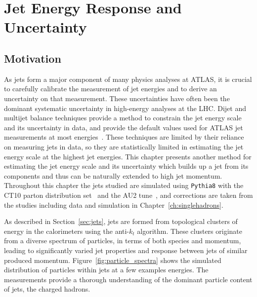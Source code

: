 \chapter{Jet Energy Response and Uncertainty}

\label{ch:jes}

\section{Motivation}

As jets form a major component of many physics analyses at ATLAS, it is crucial to carefully calibrate the measurement of jet energies and to derive an uncertainty on that measurement.
These uncertainties have often been the dominant systematic uncertainty in high-energy analyses at the LHC.
Dijet and multijet balance techniques provide a method to constrain the jet energy scale and its uncertainty in data, and provide the default values used for ATLAS jet measurements at most energies~\cite{PERF-2012-01}.
These techniques are limited by their reliance on measuring jets in data, so they are statistically limited in estimating the jet energy scale at the highest jet energies.
This chapter presents another method for estimating the jet energy scale and its uncertainty which builds up a jet from its components and thus can be naturally extended to high jet momentum.
Throughout this chapter the jets studied are simulated using \texttt{Pythia8} with the CT10 parton distribution set~\cite{CTEQ} and the AU2 tune~\cite{AU2}, and corrections are taken from the studies including data and simulation in Chapter~\ref{ch:singlehadrons}. 

As described in Section~\ref{sec:jets}, jets are formed from topological clusters of energy in the calorimeters using the anti-$k_t$ algorithm.
These clusters originate from a diverse spectrum of particles, in terms of both species and momentum, leading to significantly varied jet properties and response between jets of similar produced momentum.
Figure~\ref{fig:particle_spectra} shows the simulated distribution of particles within jets at a few examples energies.
The \ep measurements provide a thorough understanding of the dominant particle content of jets, the charged hadrons. 

